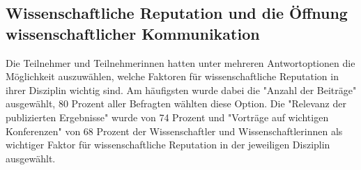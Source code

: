 \subsection{Wissenschaftliche Reputation und die Öffnung wissenschaftlicher Kommunikation}

Die Teilnehmer und Teilnehmerinnen hatten unter mehreren Antwortoptionen die Möglichkeit auszuwählen, welche Faktoren für wissenschaftliche Reputation in ihrer Disziplin wichtig sind. Am häufigsten wurde dabei die "Anzahl der Beiträge" ausgewählt, 80 Prozent aller Befragten wählten diese Option. Die "Relevanz der publizierten Ergebnisse" wurde von 74 Prozent und "Vorträge auf wichtigen Konferenzen" von 68 Prozent der Wissenschaftler und Wissenschaftlerinnen als wichtiger Faktor für wissenschaftliche Reputation in der jeweiligen Disziplin ausgewählt.

